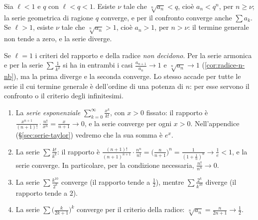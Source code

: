 \begin{dimostrazione}
Sia $\ell<1$ e $q$ con $\ell<q<1$. Esiste $\nu$ tale che $\sqrt[n]{a_{n}}<q$, cioè $a_{n}<q^{n}$, per
$n\ge\nu$; la serie geometrica di ragione $q$ converge, e per il confronto converge anche
$\sum a_{k}$. Se $\ell>1$, esiste $\nu$ tale che $\sqrt[n]{a_{n}}>1$, cioè $a_{n}>1$, per $n>\nu$: il
termine generale non tende a zero, e la serie diverge.
\end{dimostrazione}

\begin{attenzione}
Se $\ell=1$ i criteri del rapporto e della radice \emph{non decidono}. Per la serie
armonica e per la serie $\sum\frac1{k^{2}}$ si ha in entrambi i casi
$\frac{a_{n+1}}{a_{n}}\to1$ e $\sqrt[n]{a_{n}}\to1$ (\cref{cor:radice-n-nb}), ma la prima diverge e la
seconda converge. Lo stesso accade per tutte le serie il cui termine generale è
dell'ordine di una potenza di $n$: per esse servono il confronto o il criterio degli
infinitesimi.
\end{attenzione}

\begin{esempio}\label{es:rapporto-radice}
\begin{enumerate}[label=(\alph*)]
  \item La \emph{serie esponenziale} $\sum_{k=0}^{\infty}\frac{x^{k}}{k!}$, con $x>0$ fissato: il rapporto
  è $\frac{x^{n+1}}{(n+1)!}\cdot\frac{n!}{x^{n}}=\frac x{n+1}\to0$, e la serie converge per ogni $x>0$.
  Nell'appendice (\S\ref{sec:serie-taylor}) vedremo che la sua somma è $e^{x}$.
  \item La serie $\sum\frac{k!}{k^{k}}$: il rapporto è
  $\frac{(n+1)!}{(n+1)^{n+1}}\cdot\frac{n^{n}}{n!}=\bigl(\frac n{n+1}\bigr)^{n}=\frac1{(1+\frac1n)^{n}}\to\frac1e<1$, e la serie converge.
  In particolare, per la condizione necessaria, $\frac{n!}{n^{n}}\to0$.
  \item La serie $\sum\frac{k^{10}}{2^{k}}$ converge (il rapporto tende a $\frac12$), mentre
  $\sum\frac{2^{k}}{k^{10}}$ diverge (il rapporto tende a $2$).
  \item La serie $\sum\bigl(\frac k{2k+1}\bigr)^{k}$ converge per il criterio della radice:
  $\sqrt[n]{a_{n}}=\frac n{2n+1}\to\frac12$.
\end{enumerate}
\end{esempio}


